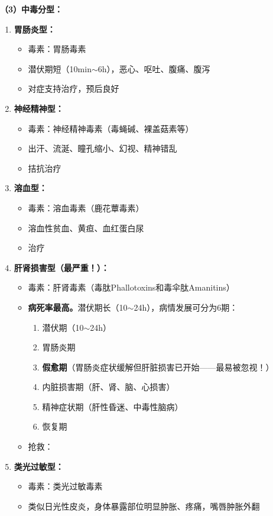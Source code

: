 \begin{keybox}
\textbf{（3）中毒分型：}
\begin{enumerate}[leftmargin=*]
    \item \textbf{胃肠炎型：}
    \begin{itemize}
        \item 毒素：胃肠毒素
        \item 潜伏期短（10min$\sim$6h），恶心、呕吐、腹痛、腹泻
        \item 对症支持治疗，预后良好
    \end{itemize}
    \item \textbf{神经精神型：}
    \begin{itemize}
        \item 毒素：神经精神毒素（毒蝇碱、裸盖菇素等）
        \item 出汗、流涎、瞳孔缩小、幻视、精神错乱
        \item {}拮抗治疗
    \end{itemize}
    \item \textbf{溶血型：}
    \begin{itemize}
        \item 毒素：溶血毒素（鹿花蕈毒素）
        \item 溶血性贫血、黄疸、血红蛋白尿
        \item {}治疗
    \end{itemize}
    \item \textbf{肝肾损害型（最严重！）：}
    \begin{itemize}
        \item 毒素：肝肾毒素（毒肽Phallotoxins和毒伞肽Amanitins）
        \item \textbf{病死率最高。}潜伏期长（10$\sim$24h），病情发展可分为6期：
        \begin{enumerate}
            \item 潜伏期（10$\sim$24h）
            \item 胃肠炎期
            \item \textbf{假愈期}（胃肠炎症状缓解但肝脏损害已开始——最易被忽视！）
            \item 内脏损害期（肝、肾、脑、心损害）
            \item 精神症状期（肝性昏迷、中毒性脑病）
            \item 恢复期
        \end{enumerate}
        \item 抢救：
    \end{itemize}
    \item \textbf{类光过敏型：}
    \begin{itemize}
        \item 毒素：类光过敏毒素
        \item 类似日光性皮炎，身体暴露部位明显肿胀、疼痛，嘴唇肿胀外翻
    \end{itemize}
\end{enumerate}


\end{keybox}
